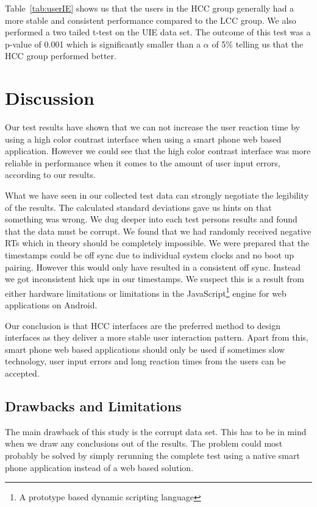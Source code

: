 \documentclass[runningheads,a4paper]{llncs}
\begin{document}
Table~\ref{tab:userIE} shows us that the users in the HCC group generally had a more stable and consistent performance compared to the LCC group. We also performed a two tailed t-test on the UIE data set. The outcome of this test was a p-value of 0.001 which is significantly smaller than a $\alpha$ of 5\% telling us that the HCC group performed better.

\section{Discussion}\label{sec:discussion}
Our test results have shown that we can not increase the user reaction time by using a high color contrast interface when using a smart phone web based application. However we could see that the high color contrast interface was more reliable in performance when it comes to the amount of user input errors, according to our results. 

What we have seen in our collected test data can strongly negotiate the legibility of the results. The calculated standard deviations gave us hints on that something was wrong. We dug deeper into each test persons results and found that the data must be corrupt. We found that we had randomly received negative RTs which in theory should be completely impossible. We were prepared that the timestamps could be off sync due to individual system clocks and no boot up pairing. However this would only have resulted in a consistent off sync. Instead we got inconsistent hick ups in our timestamps. We suspect this is a result from either hardware limitations or limitations in the JavaScript\footnote{A prototype based dynamic scripting language} engine for web applications on Android.

Our conclusion is that HCC interfaces are the preferred method to design interfaces as they deliver a more stable user interaction pattern. Apart from this, smart phone web based applications should only be used if sometimes slow technology, user input errors and long reaction times from the users can be accepted.

\subsection{Drawbacks and Limitations}\label{subsec:drawbacks}
The main drawback of this study is the corrupt data set. This has to be in mind when we draw any conclusions out of the results. The problem could most probably be solved by simply rerunning the complete test using a native smart phone application instead of a web based solution.
\end{document}
